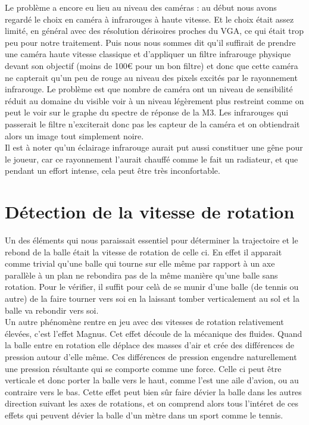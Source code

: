 Le problème a encore eu lieu au niveau des caméras : au début nous avons regardé le choix en caméra à infrarouges à haute vitesse. Et le choix était assez limité, en général avec des résolution dérisoires proches du VGA, ce qui était trop peu pour notre traitement. Puis nous nous sommes dit qu'il suffirait de prendre une caméra haute vitesse classique et d'appliquer un filtre infrarouge physique devant son objectif (moins de 100€ pour un bon filtre) et donc que cette caméra ne capterait qu'un peu de rouge au niveau des pixels excités par le rayonnement infrarouge. Le problème est que nombre de caméra ont un niveau de sensibilité réduit au domaine du visible voir à un niveau légèrement plus restreint comme on peut le voir sur le graphe du spectre de réponse de la M3. Les infrarouges qui passerait le filtre n'exciterait donc pas les capteur de la caméra et on obtiendrait alors un image tout simplement noire.\\

Il est à noter qu'un éclairage infrarouge aurait put aussi constituer une gêne pour le joueur, car ce rayonnement l'aurait chauffé comme le fait un radiateur, et que pendant un effort intense, cela peut être très inconfortable.




\section{Détection de la vitesse de rotation}

Un des éléments qui nous paraissait essentiel pour déterminer la trajectoire et le rebond de la balle était la vitesse de rotation de celle ci. En effet il apparait comme trivial qu'une balle qui tourne sur elle même par rapport à un axe parallèle à un plan ne rebondira pas de la même manière qu'une balle sans rotation. Pour le vérifier, il suffit pour celà de se munir d'une balle (de tennis ou autre) de la faire tourner vers soi en la laissant tomber verticalement au sol et la balle va rebondir vers soi.\\

Un autre phénomène rentre en jeu avec des vitesses de rotation relativement élevées, c'est l'effet Magnus. Cet effet découle de la mécanique des fluides. Quand la balle entre en rotation elle déplace des masses d'air et crée des différences de pression autour d'elle même. Ces différences de pression engendre naturellement une pression résultante qui se comporte comme une force. Celle ci peut être verticale et donc porter la balle vers le haut, comme l'est une aile d'avion, ou au contraire vers le bas. Cette effet peut bien sûr faire dévier la balle dans les autres direction suivant les axes de rotations, et on comprend alors tous l'intéret de ces effets qui peuvent dévier la balle d'un mètre dans un sport comme le tennis.\\

